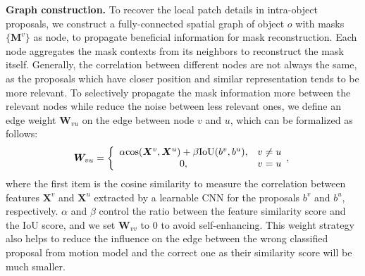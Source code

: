 \documentclass[letterpaper]{article} %
\begin{document}
\noindent \textbf{Graph construction.}
To recover the local patch details in intra-object proposals, we construct a fully-connected spatial graph of object $o$ with masks $\{\bm{M}^{v}\}$ as node, to propagate beneficial information for mask reconstruction. Each node aggregates the mask contexts from its neighbors to reconstruct the mask itself. Generally, the correlation between different nodes are not always the same, as the proposals which have closer position and similar representation tends to be more relevant. 
To selectively propagate the mask information more between the relevant nodes while reduce the noise between less relevant ones, we define an edge weight $\bm{W}_{vu}$ on the edge between node $v$ and $u$, which can be formalized as follows:
\begin{equation}
    \bm{W}_{vu} = \left\{  
             \begin{array}{cl}
              \alpha {\rm cos}(\bm{X}^v, \bm{X}^u)+\beta  \text{IoU}(b^{v}, b^{u}),  & v \neq u  \\  
              0,  & v = u  \\
             \end{array},
\right. 
\label{eq:alpha}
\end{equation}
where the first item is the cosine similarity to measure the correlation between features $\bm{X}^v$ and $\bm{X}^u$ extracted by a learnable CNN for the proposals $b^v$ and $b^u$, respectively. $\alpha$ and $\beta$ control the ratio between the feature similarity score and the IoU score, and we set $\bm{W}_{vv}$ to 0 to avoid self-enhancing. This weight strategy also helps to reduce the influence on the edge between the wrong classified proposal from motion model and the correct one as their similarity score will be much smaller.
\end{document}
